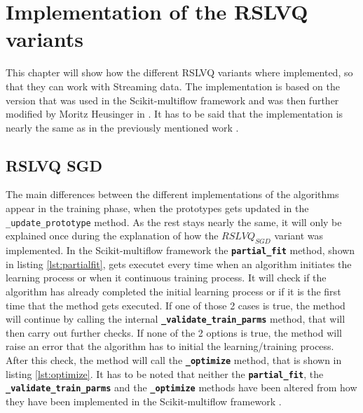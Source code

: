 \documentclass[12pt,oneside,a4paper,parskip]{scrbook}
\begin{document}
\section{Implementation of the RSLVQ variants}
This chapter will show how the different RSLVQ variants where implemented, so that they can work with Streaming data.
The implementation is based on the version that was used in the Scikit-multiflow framework \cite{skmultiflow} and was then further 
modified by Moritz Heusinger in \cite{PassiveDriftonRSLVQ}.
It has to be said that the implementation is nearly the same as in the previously mentioned work \cite{PassiveDriftonRSLVQ}.

\subsection{RSLVQ SGD}
The main differences between the different implementations of the algorithms appear in the training phase, when the prototypes
gets updated in the \texttt{\_update\_prototype} method. As the rest stays nearly the same, it will only be explained once during the explanation of how the $RSLVQ_\textit{SGD}$
variant was implemented.
In the Scikit-multiflow framework the \textbf{\texttt{partial\_fit}} method, shown in listing \ref{lst:partialfit}, gets executet every time when an algorithm initiates the
learning process or when it continuous training process. It will check if the algorithm has already completed the initial 
learning process or if it is the first time that the method gets executed. If one of those 2 cases is true, the method will
continue by calling the internal \textbf{\texttt{\_validate\_train\_parms}} method, that will then carry out further checks.
If none of the 2 options is true, the method will raise an error that the algorithm has to initial the learning/training process.
After this check, the method will call the \textbf{\texttt{\_optimize}} method, that is shown in listing \ref{lst:optimize}.
It has to be noted that neither the \textbf{\texttt{partial\_fit}}, the \textbf{\texttt{\_validate\_train\_parms}} and the \textbf{\texttt{\_optimize}} methods
have been altered from how they have been implemented in the Scikit-multiflow framework \cite{skmultiflow}.
\end{document}
